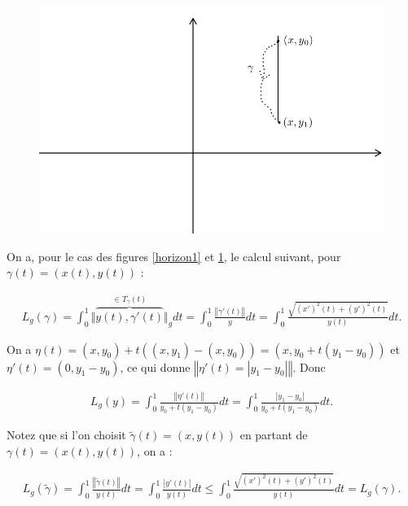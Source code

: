 \documentclass[french]{article}
\theoremstyle{definition}
\theoremstyle{remark}
\begin{document}
\begin{figure}[h!]
  \centering
  \includegraphics[scale=0.3]{figures/horizon2.png}
  \caption{}
  \label{horizon2}
\end{figure}

On a, pour le cas des figures \ref{horizon1} et \ref{horizon2}, le calcul suivant, pour \(\gamma(t) = (x(t), y(t))\) :

\begin{gather*}
  L_g(\gamma) = \int_{0}^{1}  \Vert \overbrace{y(t), \gamma'(t)}^{\in T _{\gamma}(t)} \Vert_g  dt = \int_{0}^{1} \frac{\left\Vert \gamma'(t) \right\Vert }{y}dt = \int_{0}^{1} \frac{\sqrt{(x')^2(t)+ (y')^2(t)}}{y(t)} dt.
\end{gather*}

On a \(\eta(t) = (x,y_0) + t((x,y_1)-(x,y_0)) = (x,y_0 + t(y_1 - y_0))\) et \(\eta'(t) = (0,y_1-y_0)\), ce qui donne \(\left\Vert \eta'(t) = \left\lvert y_1 - y_0 \right\rvert \right\Vert \). Donc

\begin{gather*}
  L_g(y) = \int_{0}^{1} \frac{\left\Vert \eta'(t) \right\Vert }{y_0 + t(y_1-y_0)}dt = \int_{0}^{1} \frac{\left\lvert y_1-y_0 \right\rvert}{y_0 + t(y_1-y_0)}dt.
\end{gather*}

Notez que si l'on choisit \(\tilde{\gamma}(t)=(x,y(t))\) en partant de \(\gamma(t) = (x(t),y(t))\), on a :

\begin{gather*}
  L_g(\tilde{\gamma}) = \int_{0}^{1} \frac{\left\Vert \tilde{\gamma}(t) \right\Vert }{y(t)}dt = \int_{0}^{1} \frac{\left\lvert y'(t) \right\rvert}{y(t)}dt \leq  \int_{0}^{1} \frac{\sqrt{(x')^2(t) + (y')^2(t)}}{y(t)}dt = L_g(\gamma).
\end{gather*}
\end{document}
